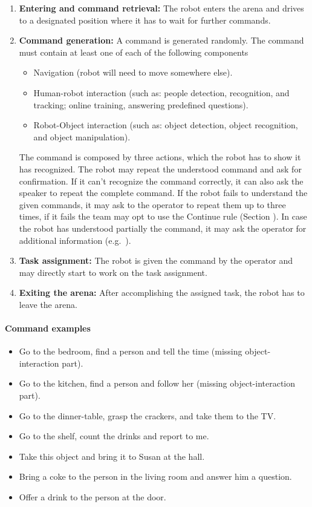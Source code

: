 \begin{enumerate}
\item \textbf{Entering and command retrieval:} The robot enters the arena and drives to a designated position where it has to wait for further commands.
\item \textbf{Command generation:} A command is generated randomly. The command must contain at least one of each of the following components
\begin{itemize}
\item Navigation (robot will need to move somewhere else).
\item Human-robot interaction (such as: people detection, recognition, and tracking; online training, answering predefined questions).
\item Robot-Object interaction (such as: object detection, object recognition, and object manipulation).
\end{itemize}
The command is composed by three actions, which the robot has to show it has recognized. The robot may repeat the understood command and ask for confirmation. If it can't recognize the command correctly, it can also ask the speaker to repeat the complete command. If the robot fails to understand the given commands, it may ask to the operator to repeat them up to three times, if it fails the team may opt to use the Continue rule (Section ). In case the robot has understood partially the command, it may ask the operator for additional information (e.g.~).
\item \textbf{Task assignment:} The robot is given the command by the operator and may directly start to work on the task assignment.
\item \textbf{Exiting the arena:} After accomplishing the assigned task, the robot has to leave the arena.
\end{enumerate}

\paragraph{Command examples}
\begin{itemize}
\item Go to the bedroom, find a person and tell the time (missing object-interaction part).
\item Go to the kitchen, find a person and follow her (missing object-interaction part).
\item Go to the dinner-table, grasp the crackers, and take them to the TV.
\item Go to the shelf, count the drinks and report to me.
\item Take this object and bring it to Susan at the hall.
\item Bring a coke to the person in the living room and answer him a question.
\item Offer a drink to the person at the door.
\end{itemize}

